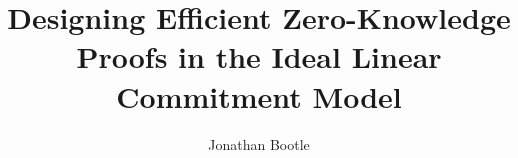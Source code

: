 
\title{Designing Efficient Zero-Knowledge Proofs in the Ideal Linear Commitment Model}
\author{Jonathan Bootle}

\maketitle
\makedeclaration

